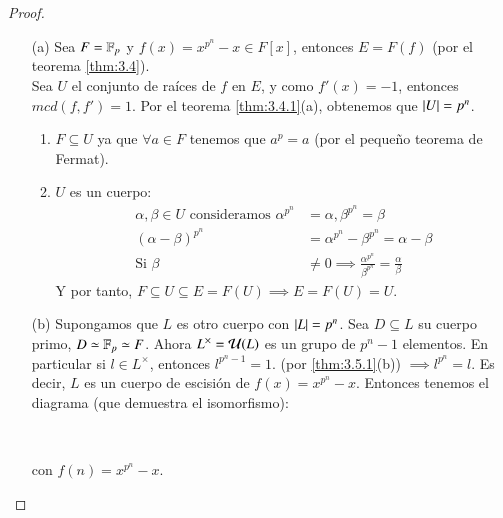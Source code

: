 \begin{proof}$ $
    \begin{itemize}
        \item[(a)] Sea $F = \mathbb{F}_p$ y $f(x) = x^{p^n} - x \in F[x]$, entonces $E = F(f)$ (por el teorema \ref{thm:3.4}).\\
        Sea $U$ el conjunto de raíces de $f$ en $E$, y como $f'(x) = -1$, entonces $mcd(f, f') = 1$. Por el teorema \ref{thm:3.4.1}(a), obtenemos que $\left|U\right| = p^n$.\\

        \begin{enumerate}
            \item $F \subseteq U$ ya que $\forall a \in F$ tenemos que $a^p = a$ (por el pequeño teorema de Fermat).
            \item $U$ es un cuerpo:
            \begin{align*}
                \alpha, \beta \in U \text{ consideramos } \alpha^{p^n} &= \alpha, \beta^{p^n} = \beta \\
                (\alpha-\beta)^{p^n} &= \alpha^{p^n} - \beta^{p^n} = \alpha - \beta \\
                \text{Si } \beta &\neq 0 \implies \frac{\alpha^{p^n}}{\beta^{p^n}} = \frac{\alpha}{\beta}
            \end{align*}
            Y por tanto, $F \subseteq U \subseteq E = F(U) \implies E = F(U) = U$.
        \end{enumerate}
        \item[(b)] Supongamos que $L$ es otro cuerpo con $\left|L\right| = p^n$. Sea $D \subseteq L$ su cuerpo primo, $D \simeq \mathbb{F}_p \simeq F$. Ahora $L^\times = \mathcal{U}(L)$ es un grupo de $p^n - 1$ elementos. En particular si $l \in L^\times$, entonces $l^{p^n-1} = 1$. (por \ref{thm:3.5.1}(b)) $\implies l^{p^n} = l$. Es decir, $L$ es un cuerpo de escisión de $f(x) = x^{p^n} - x$. Entonces tenemos el diagrama (que demuestra el isomorfismo):

        \begin{center}
            \\
        \end{center}
        con $f(n) = x^{p^n} -  x$.
    \end{itemize}
\end{proof}

